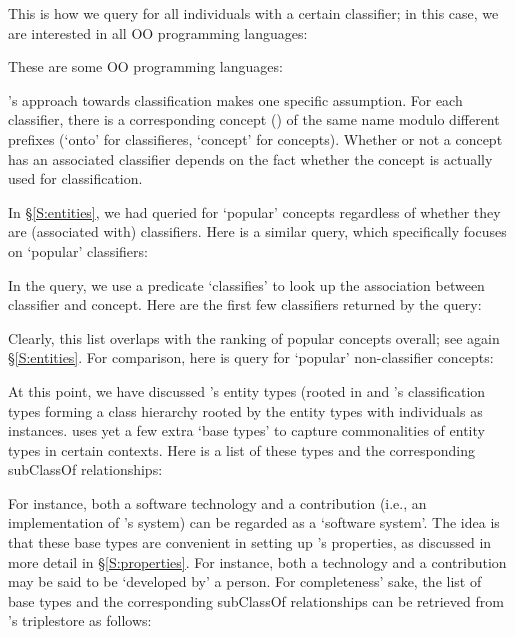 \noindent
This is how we query for all individuals with a certain classifier; in this case, we are interested in all OO programming languages:


\noindent
These are some OO programming languages:


\solasote's approach towards classification makes one specific assumption.  For each classifier, there is a corresponding concept () of the same name modulo different prefixes (`onto' for classifieres, `concept' for concepts). Whether or not a concept has an associated classifier depends on the fact whether the concept is actually used for classification.

In \S\ref{S:entities}, we had queried for `popular' concepts regardless of whether they are (associated with) classifiers. Here is a similar query, which specifically focuses on `popular' classifiers:


\noindent
In the query, we use a predicate `classifies' to look up the association between classifier and concept. Here are the first few classifiers returned by the query:


\noindent
Clearly, this list overlaps with the ranking of popular concepts overall; see again \S\ref{S:entities}. For comparison, here is query for `popular' non-classifier concepts:



At this point, we have discussed \solasote's entity types (rooted in
 and \solasote's classification types forming a class
hierarchy rooted by the entity types with individuals as
instances. \solasote{} uses yet a few extra `base types' to capture
commonalities of entity types in certain contexts. Here is a list of
these types and the corresponding subClassOf relationships:



\noindent
For instance, both a software technology and a contribution (i.e., an
implementation of \ooo{}'s system) can be regarded as a `software
system'.  The idea is that these base types are convenient in setting
up \solasote's properties, as discussed in more detail in
\S\ref{S:properties}. For instance, both a technology and a
contribution may be said to be `developed by' a person. For
completeness' sake, the list of base types and the corresponding
subClassOf relationships can be retrieved from \solasote's triplestore
as follows:

